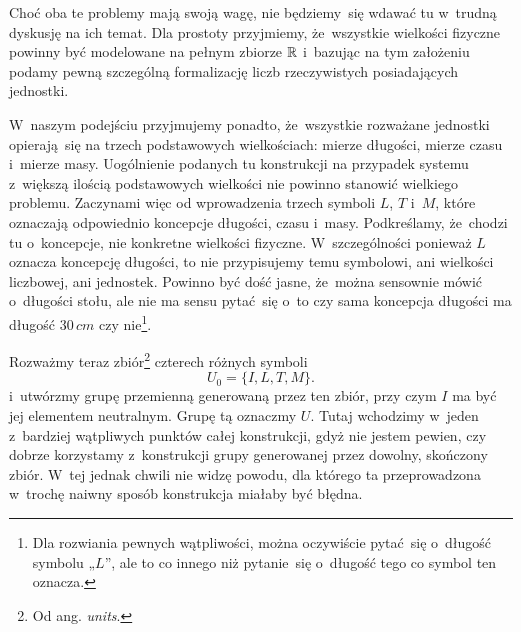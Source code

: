 \documentclass[a4paper,11pt]{article}
\begin{document}
Choć oba te problemy mają swoją wagę, nie będziemy~się wdawać tu w~trudną
dyskusję na ich temat. Dla prostoty przyjmiemy, że~wszystkie wielkości
fizyczne powinny być modelowane na pełnym zbiorze $\mathbb{R}$ i~bazując
na tym założeniu podamy pewną szczególną formalizację liczb rzeczywistych
posiadających jednostki.

W~naszym podejściu przyjmujemy ponadto, że~wszystkie rozważane jednostki
opierają~się na trzech podstawowych wielkościach: mierze długości,
mierze czasu i~mierze masy. Uogólnienie podanych tu konstrukcji na
przypadek systemu z~większą ilością podstawowych wielkości nie powinno
stanowić wielkiego problemu.
Zaczynami więc od wprowadzenia trzech symboli $L$, $T$ i~$M$, które
oznaczają odpowiednio koncepcje długości, czasu i~masy. Podkreślamy,
że~chodzi tu o~koncepcje, nie konkretne wielkości fizyczne. W~szczególności
ponieważ $L$ oznacza koncepcję długości, to nie przypisujemy temu symbolowi,
ani wielkości liczbowej, ani jednostek. Powinno być dość jasne, że~można
sensownie mówić o~długości stołu, ale nie ma sensu pytać~się o~to czy
sama koncepcja długości ma długość $30 \, \si{cm}$ czy nie\footnote{Dla
  rozwiania pewnych wątpliwości, można oczywiście pytać~się o~długość
  symbolu „$L$”, ale to co innego niż pytanie~się o~długość tego co symbol
  ten oznacza.}.

Rozważmy teraz zbiór\footnote{Od ang. \textit{units}.} czterech różnych
symboli
\begin{equation}
  \label{eq:Mechanika-Rozwazania-ogolne-02}
  U_{ 0 } = \{ I, L, T, M \}.
\end{equation}
i~utwórzmy grupę przemienną generowaną przez ten zbiór, przy czym $I$ ma
być jej elementem neutralnym. Grupę tą oznaczmy $U$. Tutaj wchodzimy
w~jeden z~bardziej wątpliwych punktów całej konstrukcji, gdyż nie jestem
pewien, czy dobrze korzystamy z~konstrukcji grupy generowanej przez
dowolny, skończony zbiór. W~tej jednak chwili nie widzę powodu, dla
którego ta przeprowadzona w~trochę naiwny sposób konstrukcja miałaby
być błędna.
\end{document}
